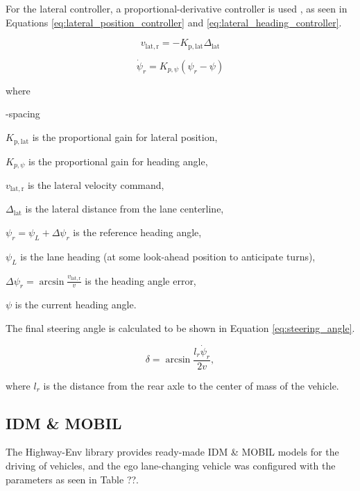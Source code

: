 \documentclass[12pt, a4paper]{report}
\begin{document}
For the lateral controller, a proportional-derivative controller is used \cite{highway-env}, as seen in Equations \ref{eq:lateral_position_controller} and \ref{eq:lateral_heading_controller}.

\begin{equation}
    v_{\mathrm{lat, r}} = -K_{\mathrm{p, lat}}\Delta_{\mathrm{lat}}
    \label{eq:lateral_position_controller}
\end{equation}

\begin{equation}
    \dot{\psi}_r = K_{p, \psi}(\psi_r - \psi)
    \label{eq:lateral_heading_controller}
\end{equation}

where

\begin{list}{-}{spacing}
    \item $K_{\mathrm{p, lat}}$ is the proportional gain for lateral position,
    \item $K_{p, \psi}$ is the proportional gain for heading angle,
    \item $v_{\mathrm{lat, r}}$ is the lateral velocity command,
    \item $\Delta_{\mathrm{lat}}$ is the lateral distance from the lane centerline,
    \item $\psi_r = \psi_L + \Delta\psi_r$ is the reference heading angle,
    \item $\psi_L$ is the lane heading (at some look-ahead position to anticipate turns),
    \item $\Delta\psi_r = \arcsin\frac{v_{\mathrm{lat, r}}}{v}$ is the heading angle error,
    \item $\psi$ is the current heading angle.
\end{list}

The final steering angle is calculated to be shown in Equation \ref{eq:steering_angle}.

\begin{equation}
    \delta = \arcsin\frac{l_r\dot{\psi}_r}{2v},
    \label{eq:steering_angle}
\end{equation} 

where $l_r$ is the distance from the rear axle to the center of mass of the vehicle.

\subsection{IDM \& MOBIL}

The Highway-Env library provides ready-made IDM & MOBIL models for the driving of vehicles, and the ego lane-changing vehicle was configured with the parameters as seen in Table ??.
\end{document}
